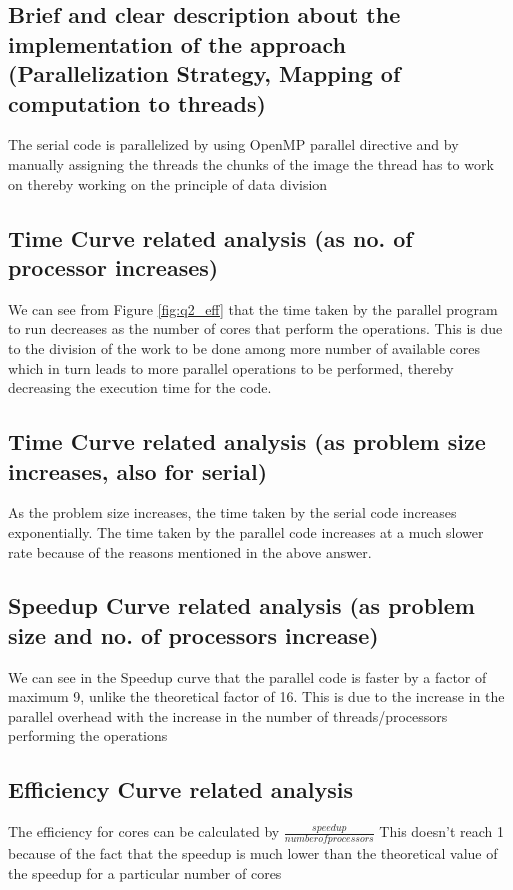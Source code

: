 \documentclass[runningheads, a4paper, oribibl]{llncs}
\begin{document}
\subsection{Brief and clear description about the implementation of the approach (Parallelization Strategy, Mapping of computation to threads)}
The serial code is parallelized by using OpenMP parallel directive and by manually assigning the threads the chunks of the image the thread has to work on thereby working on the principle of data division

\subsection{Time Curve related analysis (as no. of processor increases)}
We can see from Figure \ref{fig:q2_eff} that the time taken by the parallel program to run decreases as the number of cores that perform the operations. This is due to the division of the work to be done among more number of available cores which in turn leads to more parallel operations to be performed, thereby decreasing the execution time for the code.

\subsection{Time Curve related analysis (as problem size increases, also for serial)}
As the problem size increases, the time taken by the serial code increases exponentially. The time taken by the parallel code increases at a much slower rate because of the reasons mentioned in the above answer.

\subsection{Speedup Curve related analysis (as problem size and no. of processors increase)}
We can see in the Speedup curve that the parallel  code is faster by a factor of maximum 9, unlike the theoretical factor of 16. This is due to the increase in the parallel overhead with the increase in the number of threads/processors performing the operations

\subsection{Efficiency Curve related analysis}
The efficiency for cores can be calculated by $\frac{speedup}{number of processors}$ This doesn't reach 1 because of the fact that the speedup is much lower than the theoretical value of the speedup for a particular number of cores
\end{document}
